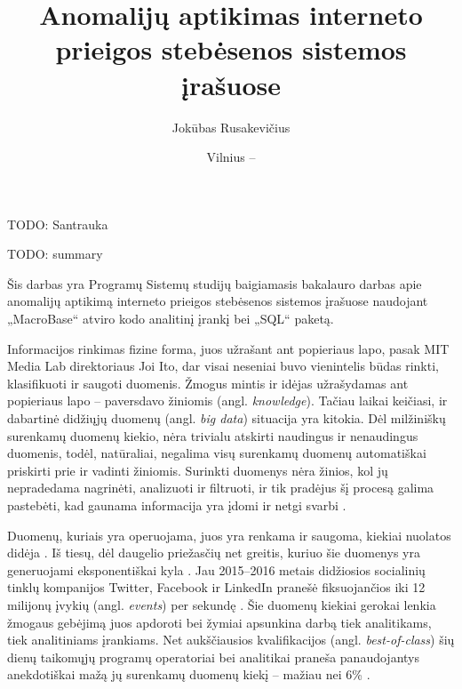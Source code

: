 \documentclass{VUMIFPSbakalaurinis}
\title{Anomalijų aptikimas interneto prieigos stebėsenos sistemos įrašuose}
\author{Jokūbas Rusakevičius}
\date{Vilnius – \the\year}
\begin{document}
\maketitle

\setcounter{page}{2}

TODO: Santrauka

TODO: summary

\tableofcontents

Šis darbas yra Programų Sistemų studijų baigiamasis bakalauro darbas apie anomalijų aptikimą interneto prieigos stebėsenos sistemos įrašuose naudojant „MacroBase“ atviro kodo analitinį įrankį bei „SQL“ paketą.

Informacijos rinkimas fizine forma, juos užrašant ant popieriaus lapo, pasak MIT Media Lab direktoriaus Joi Ito, dar visai neseniai buvo vienintelis būdas rinkti, klasifikuoti ir saugoti duomenis. Žmogus mintis ir idėjas užrašydamas ant popieriaus lapo – paversdavo žiniomis (angl. \textit{knowledge}). Tačiau laikai keičiasi, ir dabartinė didžiųjų duomenų (angl. \textit{big data}) situacija yra kitokia. Dėl milžiniškų surenkamų duomenų kiekio, nėra trivialu atskirti naudingus ir nenaudingus duomenis, todėl, natūraliai, negalima visų surenkamų duomenų automatiškai priskirti prie ir vadinti žiniomis. Surinkti duomenys nėra žinios, kol jų nepradedama nagrinėti, analizuoti ir filtruoti, ir tik pradėjus šį procesą galima pastebėti, kad gaunama informacija yra įdomi ir netgi svarbi \cite{movie}.\par

Duomenų, kuriais yra operuojama, juos yra renkama ir saugoma, kiekiai nuolatos didėja \cite{iot}. Iš tiesų, dėl daugelio priežasčių net greitis, kuriuo šie duomenys yra generuojami eksponentiškai kyla \cite{zettabytes}. Jau 2015–2016 metais didžiosios socialinių tinklų kompanijos Twitter, Facebook ir LinkedIn pranešė fiksuojančios iki 12 milijonų įvykių (angl. \textit{events}) per sekundę \cite{twitter, facebook, linkedin}. Šie duomenų kiekiai gerokai lenkia žmogaus gebėjimą juos apdoroti bei žymiai apsunkina darbą tiek analitikams, tiek analitiniams įrankiams. Net aukščiausios kvalifikacijos (angl. \textit{best-of-class}) šių dienų taikomųjų programų operatoriai bei analitikai praneša panaudojantys anekdotiškai mažą jų surenkamų duomenų kiekį – mažiau nei 6\% \cite{prioritizing_attention}.\par
\end{document}
